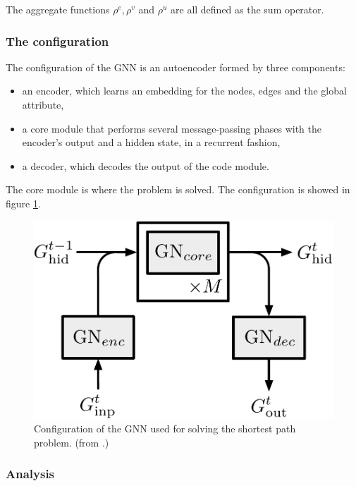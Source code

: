 \documentclass{article}
\begin{document}
The aggregate functions $\rho^e, \rho^v$ and $\rho^u$ are all defined as the sum operator.
        
        \subsubsection{The configuration}

The configuration of the GNN is an autoencoder formed by three components:
\begin{itemize}
    \item an encoder, which learns an embedding for the nodes, edges and the global attribute,
    \item a core module that performs several message-passing phases with the encoder's output and a hidden state, in a recurrent fashion,
    \item a decoder, which decodes the output of the code module.
\end{itemize}

The core module is where the problem is solved. The configuration is showed in figure \ref{fig:GN-rnn-config}.

\begin{figure}
    \centering
    \includegraphics[scale=.4]{images/GN-rnn-config.pdf}
    \caption{Configuration of the GNN used for solving the shortest path problem. (from \cite{battaglia2018relational}.)}
    \label{fig:GN-rnn-config}
\end{figure}

        \subsubsection{Analysis}
\end{document}
